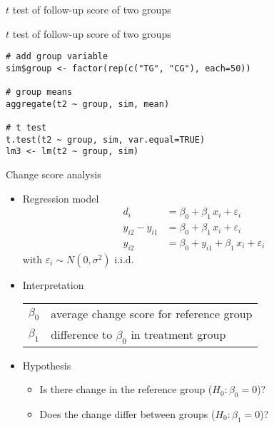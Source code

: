 \documentclass{beamer}
\begin{document}
\begin{frame}{$t$ test of follow-up score of two groups}
\begin{center}
\end{center}
\end{frame}

{

\begin{frame}[fragile]{$t$ test of follow-up score of two groups}
\begin{lstlisting}
# add group variable
sim$group <- factor(rep(c("TG", "CG"), each=50))

# group means
aggregate(t2 ~ group, sim, mean)

# t test
t.test(t2 ~ group, sim, var.equal=TRUE)
lm3 <- lm(t2 ~ group, sim)
\end{lstlisting}
\end{frame}

}

\begin{frame}{Change score analysis}
\begin{itemize}
  \item Regression model
    \begin{align*}
                  d_i &= \beta_0 + \beta_1 \, x_i + \varepsilon_i \\
      y_{i2} - y_{i1} &= \beta_0 + \beta_1 \, x_i + \varepsilon_i \\
               y_{i2} &= \beta_0 + y_{i1} + \beta_1 \, x_i + \varepsilon_i
    \end{align*}
    with $\varepsilon_i \sim N(0, \sigma^2)$ i.i.d.
  \item Interpretation
    \begin{tabular}{lp{10cm}}
    $\beta_0$ & average change score for reference group\\
    $\beta_1$ & difference to $\beta_0$ in treatment group
    \end{tabular}
  \item Hypothesis
    \begin{itemize}
        \item Is there change in the reference group ($H_0\colon \beta_0 = 0$)?
        \item Does the change differ between groups ($H_0\colon \beta_1 =0$)?
    \end{itemize}
\end{itemize}
\end{frame}
\end{document}
